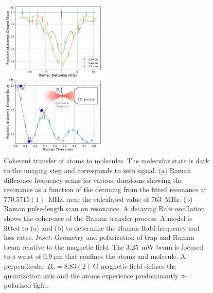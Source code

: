 \documentclass[aps,prx,twocolumn,10pt,superscriptaddress]{revtex4-2}
\begin{document}
\begin{figure}[t!]
  \includegraphics[width=0.48\textwidth]{fig-raman.pdf}
  \caption{Coherent transfer of atoms to molecules.  The molecular state is dark to the imaging step and corresponds to zero signal.
    (a) Raman difference frequency scans for various durations
    showing the resonance as a function of the detuning from
    the fitted resonance at $770.5715(1)$~MHz, near the calculated value of $763$~MHz.
    (b) Raman pulse-length scan on resonance.
    A decaying Rabi oscillation shows the coherence of
    the Raman transfer process.
    A model is fitted to (a) and (b) to determine
    the Raman Rabi frequency and loss rates.
    \emph{Inset:} Geometry and polarization of trap and Raman beam relative to the magnetic field.
    The 3.25~mW beam is focused to a waist of $0.9~\mathrm{\mu m}$
    that confines the atoms and molecule.
    A perpendicular $B_0=8.83(2)~\mathrm{G}$ magnetic field
    defines the quantization axis and the atoms experience predominantly $\pi$-polarized light.
    \label{f-raman}}
\end{figure}
\end{document}
